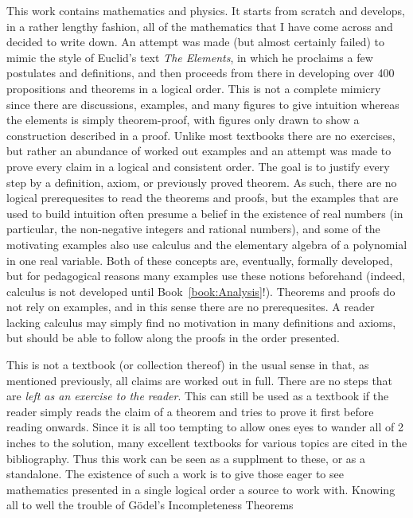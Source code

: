 This work contains mathematics and physics. It starts from scratch and develops,
in a rather lengthy fashion, all of the mathematics that I have come across and
decided to write down. An attempt was made (but almost certainly failed) to
mimic the style of Euclid's text \textit{The Elements}, in which he proclaims a
few postulates and definitions, and then proceeds from there in developing over
400 propositions and theorems in a logical order. This is not a complete mimicry
since there are discussions, examples, and many figures to give intuition
whereas the elements is simply theorem-proof, with figures only drawn to show a
construction described in a proof. Unlike most textbooks there are no exercises,
but rather an abundance of worked out examples and an attempt was made to prove
every claim in a logical and consistent order. The goal is to justify every step
by a definition, axiom, or previously proved theorem. As such, there are no
logical prerequesites to read the theorems and proofs, but the examples that are
used to build intuition often presume a belief in the existence of real numbers
(in particular, the non-negative integers and rational numbers), and some of
the motivating examples also use calculus and the elementary algebra of a
polynomial in one real variable. Both of these concepts are, eventually,
formally developed, but for pedagogical reasons many examples use these notions
beforehand (indeed, calculus is not developed until Book~\ref{book:Analysis}!).
Theorems and proofs do not rely on examples, and in this sense there are no
prerequesites. A reader lacking calculus may simply find no motivation in many
definitions and axioms, but should be able to follow along the proofs in the
order presented.
\par\hfill\par
This is not a textbook (or collection thereof) in the usual sense in that, as
mentioned previously, all claims are worked out in full. There are no steps that
are \textit{left as an exercise to the reader}. This can still be used as a
textbook if the reader simply reads the claim of a theorem and tries to prove
it first before reading onwards. Since it is all too tempting to allow ones eyes
to wander all of 2 inches to the solution, many excellent textbooks for various
topics are cited in the bibliography. Thus this work can be seen as a supplment
to these, or as a standalone. The existence of such a work is to give those
eager to see mathematics presented in a single logical order a source to work
with. Knowing all to well the trouble of G\"{o}del's Incompleteness Theorems
